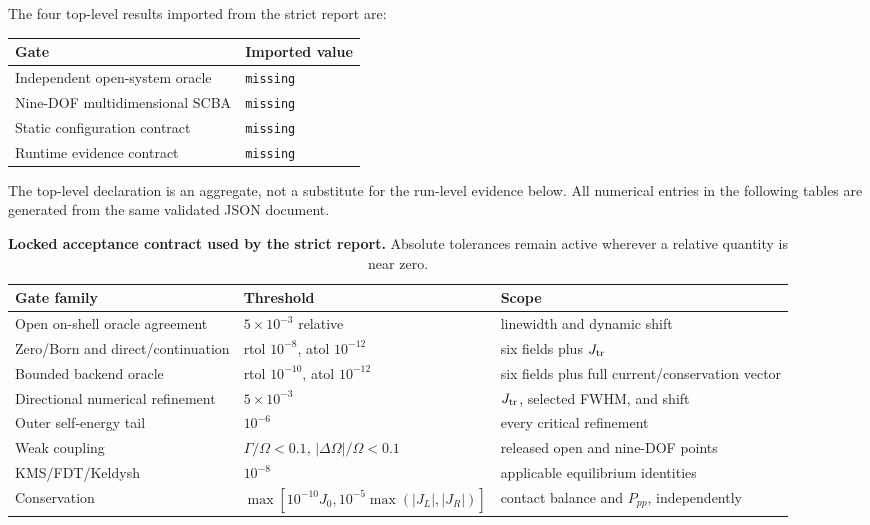 \documentclass[11pt]{article}
\def\ToyGateOraclePassed{missing}
\def\ToyGateMultidimensionalPassed{missing}
\def\ToyGateStaticConfigurationPassed{missing}
\def\ToyGateRuntimeEvidencePassed{missing}
\renewcommand{\_}{\OriginalTextUnderscore\allowbreak}
\begin{document}
The four top-level results imported from the strict report are:
\begin{center}
\begin{tabular}{@{}ll@{}}
\toprule
Gate & Imported value \\
\midrule
Independent open-system oracle & \texttt{\ToyGateOraclePassed} \\
Nine-DOF multidimensional SCBA & \texttt{\ToyGateMultidimensionalPassed} \\
Static configuration contract & \texttt{\ToyGateStaticConfigurationPassed} \\
Runtime evidence contract & \texttt{\ToyGateRuntimeEvidencePassed} \\
\bottomrule
\end{tabular}
\end{center}
The top-level declaration is an aggregate, not a substitute for the
run-level evidence below. All numerical entries in the following tables are
generated from the same validated JSON document.

\begin{table}[t]
\centering
\caption{\textbf{Locked acceptance contract used by the strict report.}
Absolute tolerances remain active wherever a relative quantity is near zero.}
\label{tab:acceptance-contract}
\small
\begin{tabularx}{\textwidth}{@{}L{39mm}L{54mm}Y@{}}
\toprule
Gate family & Threshold & Scope \\
\midrule
Open on-shell oracle agreement & \(5\times10^{-3}\) relative & linewidth and dynamic shift \\
Zero/Born and direct/continuation & rtol \(10^{-8}\), atol \(10^{-12}\) & six fields plus \(J_{\rm tr}\) \\
Bounded backend oracle & rtol \(10^{-10}\), atol \(10^{-12}\) & six fields plus full current/conservation vector \\
Directional numerical refinement & \(5\times10^{-3}\) & \(J_{\rm tr}\), selected FWHM, and shift \\
Outer self-energy tail & \(10^{-6}\) & every critical refinement \\
Weak coupling & \(\Gamma/\Omega<0.1\), \(|\Delta\Omega|/\Omega<0.1\) & released open and nine-DOF points \\
KMS/FDT/Keldysh & \(10^{-8}\) & applicable equilibrium identities \\
Conservation & \(\max[10^{-10}J_0,10^{-5}\max(|J_L|,|J_R|)]\) & contact balance and \(P_{pp}\), independently \\
\bottomrule
\end{tabularx}
\end{table}
\end{document}
